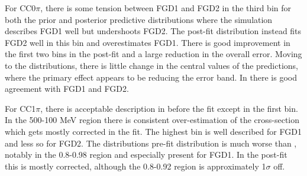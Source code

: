 For CC0$\pi$, there is some tension between FGD1 and FGD2 in the third \pmu bin for both the prior and posterior predictive distributions where the simulation describes FGD1 well but undershoots FGD2. The post-fit distribution instead fits FGD2 well in this bin and overestimates FGD1. There is good improvement in the first two \pmu bins in the post-fit and a large reduction in the overall error. Moving to the \cosmu distributions, there is little change in the central values of the predictions, where the primary effect appears to be reducing the error band. In \cosmu there is good agreement with FGD1 and FGD2.

For CC1$\pi$, there is acceptable description in \pmu before the fit except in the first bin. In the 500-100 MeV region there is consistent over-estimation of the cross-section which gets mostly corrected in the fit. The highest bin is well described for FGD1 and less so for FGD2. The \cosmu distributions pre-fit distribution is much worse than \pmu, notably in the 0.8-0.98 region and especially present for FGD1. In the post-fit this is mostly corrected, although the 0.8-0.92 region is approximately 1$\sigma$ off.
